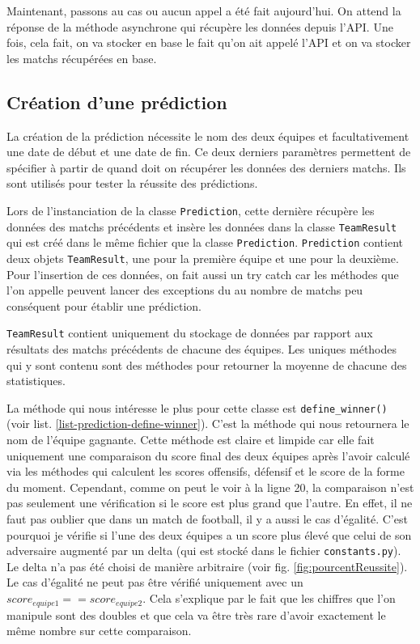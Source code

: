 \documentclass[a4paper,14pt]{extarticle}
\begin{document}
{Maintenant, passons au cas ou aucun appel a été fait aujourd'hui. On attend la réponse de la méthode asynchrone qui récupère les données depuis l'API. Une fois, cela fait, on va stocker en base le fait qu'on ait appelé l'API et on va stocker les matchs récupérées en base.

\subsection{Création d'une prédiction}

La création de la prédiction nécessite le nom des deux équipes et facultativement une date de début et une date de fin. Ce deux derniers paramètres permettent de spécifier à partir de quand doit on récupérer les données des derniers matchs. Ils sont utilisés pour tester la réussite des prédictions.


Lors de l'instanciation de la classe \texttt{Prediction}, cette dernière récupère les données des matchs précédents et insère les données dans la classe \texttt{TeamResult} qui est créé dans le même fichier que la classe \texttt{Prediction}. \texttt{Prediction} contient deux objets \texttt{TeamResult}, une pour la première équipe et une pour la deuxième. Pour l'insertion de ces données, on fait aussi un try catch car les méthodes que l'on appelle peuvent lancer des exceptions du au nombre de matchs peu conséquent pour établir une prédiction.

\texttt{TeamResult} contient uniquement du stockage de données par rapport aux résultats des matchs précédents de chacune des équipes. Les uniques méthodes qui y sont contenu sont des méthodes pour retourner la moyenne de chacune des statistiques.

La méthode qui nous intéresse le plus pour cette classe est \texttt{define\_winner()} (voir list. \ref{list-prediction-define-winner}). C'est la méthode qui nous retournera le nom de l'équipe gagnante. Cette méthode est claire et limpide car elle fait uniquement une comparaison du score final des deux équipes après l'avoir calculé via les méthodes qui calculent les scores offensifs, défensif et le score de la forme du moment. 
Cependant, comme on peut le voir à la ligne 20, la comparaison n'est pas seulement une vérification si le score est plus grand que l'autre. En effet, il ne faut pas oublier que dans un match de football, il y a aussi le cas d'égalité. C'est pourquoi je vérifie si l'une des deux équipes a un score plus élevé que celui de son adversaire augmenté par un delta (qui est stocké dans le fichier \texttt{constants.py}). Le delta n'a pas été choisi de manière arbitraire (voir fig. \ref{fig:pourcentReussite}). Le cas d'égalité ne peut pas être vérifié uniquement avec un $score_{equipe1} == score_{equipe2}$. Cela s'explique par le fait que les chiffres que l'on manipule sont des doubles et que cela va être très rare d'avoir exactement le même nombre sur cette comparaison.

}
\end{document}
